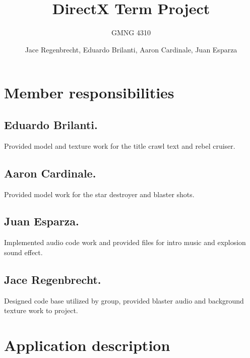 \documentclass[a4paper]{scrartcl}
\title{DirectX Term Project}
\subtitle{GMNG 4310}
\author{Jace Regenbrecht, Eduardo Brilanti, Aaron Cardinale, Juan Esparza}
\begin{document}
\maketitle

\section{Member responsibilities}

\subsection{Eduardo Brilanti.} Provided model and texture work for the title crawl text and rebel cruiser.
\subsection{Aaron Cardinale.} Provided model work for the star destroyer and blaster shots.
\subsection{Juan Esparza.} Implemented audio code work and provided files for intro music and explosion sound effect.
\subsection{Jace Regenbrecht.} Designed code base utilized by group, provided blaster audio and background texture work to project.

\section{Application description}
\end{document}
